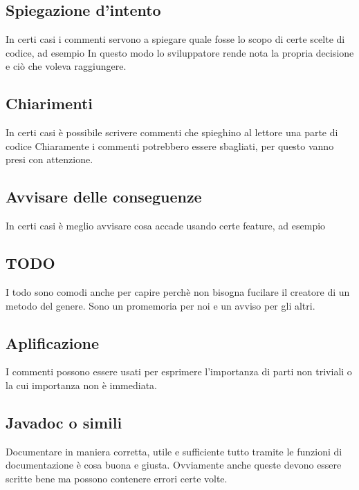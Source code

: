 \documentclass[11pt,a4paper]{book}
\begin{document}
\subsection{Spiegazione d'intento}
In certi casi i commenti servono a spiegare quale fosse lo scopo di certe scelte di codice, ad esempio
\label{code: 027}
In questo modo lo sviluppatore rende nota la propria decisione e ciò che voleva raggiungere.

\subsection{Chiarimenti}
In certi casi è possibile scrivere commenti che spieghino al lettore una parte di codice 
\label{code: 028}
Chiaramente i commenti potrebbero essere sbagliati, per questo vanno presi con attenzione.

\subsection{Avvisare delle conseguenze}
In certi casi è meglio avvisare cosa accade usando certe feature, ad esempio
\label{code: 029}

\subsection{TODO}
\label{code: 030}
I todo sono comodi anche per capire perchè non bisogna fucilare il creatore di un metodo del genere. Sono un promemoria per noi e un avviso per gli altri.


\subsection{Aplificazione}
I commenti possono essere usati per esprimere l'importanza di parti non triviali o la cui importanza non è immediata.
\label{code: 031}

\subsection{Javadoc o simili}
Documentare in maniera corretta, utile e sufficiente tutto tramite le funzioni di documentazione è cosa buona e giusta. Ovviamente anche queste devono essere scritte bene ma possono contenere errori certe volte.
\end{document}

